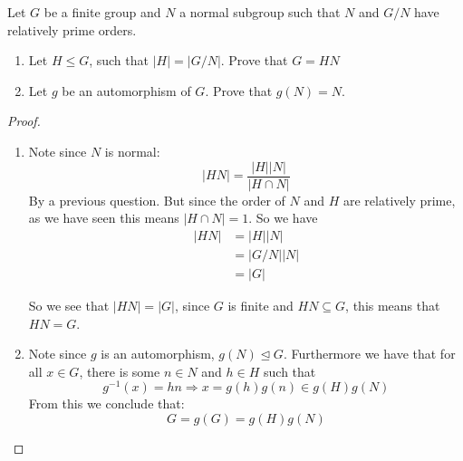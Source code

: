 \begin{exercise}
    Let $G$ be a finite group and $N$ a normal subgroup such that $N$ and $G/N$ have relatively prime orders.
    \begin{enumerate}[label = (\alph*)]
        \item Let $H\leq G$, such that $|H| = |G/N|$. Prove that $G = HN$
        \item Let $g$ be an automorphism of $G$. Prove that $g(N) = N$.
    \end{enumerate}
    \begin{proof}
        \begin{enumerate}[label = (\alph*)]
            \item  Note since $N$ is normal:\[|HN| = \frac{|H||N|}{|H\cap N|}\] By a previous question. But since the order of $N$ and $H$ are relatively prime, as we have seen this means $|H\cap N| = 1$.
            So we have \begin{align*}
                |HN| &= |H||N|\\
                &= |G/N||N|\\
                &= |G|
            \end{align*}

            So we see that $|HN| = |G|$, since $G$ is finite and $HN\subseteq G$, this means that $HN = G$.

            \item Note since $g$ is an automorphism, $g(N)\trianglelefteq G$. Furthermore we have that for all $x\in G$, there is some $n\in N$ and $h\in H$ such that \[g^{-1}(x) = hn \Rightarrow x = g(h)g(n)\in g(H)g(N) \]
            From this we conclude that: \[G = g(G) = g(H)g(N)\]
        \end{enumerate}
    \end{proof}
\end{exercise}
